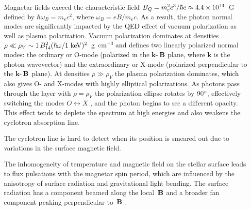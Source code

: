 Magnetar fields exceed the characteristic field 
$B_Q=m_e^2c^3/\hbar e\approx 4.4\times 10^{13}$~G 
defined by $\hbar \omega_B=m_ec^2$, where $\omega_B=eB/m_ec$. 
As a result, the photon normal modes are significantly 
impacted by the QED effect of vacuum polarization as well as plasma polarization.
Vacuum polarization dominates at densities 
$\rho\ll\rho_V\sim 1\, B_{14}^2 (\hbar\omega/1{\rm ~keV})^2$~g~cm$^{-3}$
and defines two linearly polarized normal modes:
the ordinary or O-mode (polarized in the ${\mathbf k}$-${\,\mathbf B}$ plane, 
where ${\mathbf k}$ is the photon wavevector) and the extraordinary or X-mode
(polarized perpendicular to the ${\mathbf k}$-${\,\mathbf B}$ plane).
At densities $\rho\gg \rho_V$ the plasma polarization dominates, 
which also gives O- and X-modes with highly elliptical polarizations. 
As photons pass through the layer with $\rho=\rho_V$
the polarization ellipse rotates by $90^{\rm o}$, effectively switching the modes
$O\leftrightarrow X$ \citep{lh03}, and the photon begins to see a different opacity. 
This effect tends to deplete the spectrum at high energies 
and also weakens the cyclotron absorption line.

The cyclotron line is hard to detect when its position is smeared 
out due to variations in the surface magnetic field.

The inhomogeneity of temperature and magnetic field on the stellar surface
leads to flux pulsations with the magnetar spin period, 
which are influenced by the anisotropy of surface radiation and gravitational light 
bending. The surface radiation has a component beamed 
along the local ${\,\mathbf B}$ and a broader fan component peaking perpendicular to ${\,\mathbf B}$ \citep{zpsv95}. 



